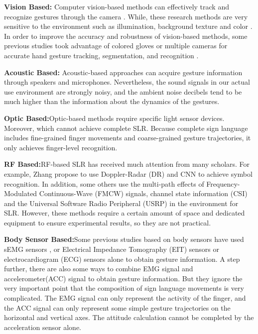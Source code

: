 \documentclass[10pt, conference, letterpaper]{IEEEtran}
\begin{document}
\vspace{1mm}
\textbf{Vision Based:} Computer vision-based methods can effectively track and recognize gestures through the camera \cite{huang2018video,neto2018sign,joshi2017personalizing,cui2017recurrent,tsironi2016gesture,ren2016robust,dong2015american,marin2014hand}. While, these research methods are very sensitive to the environment such as illumination, background texture and color \cite{mitra2007gesture,mantyjarvi2004enabling}. In order to improve the accuracy and robustness of vision-based methods, some previous studies
took advantage of  colored gloves \cite{starner1998real} or multiple cameras \cite{vogler1998asl} for accurate hand gesture tracking, segmentation, and recognition \cite{zhang2011framework}.

\textbf{Acoustic Based:} Acoustic-based \cite{mao2016cat,nandakumar2016fingerio} approaches can acquire gesture information through speakers and microphones. Nevertheless, the sound signals in our actual use environment are strongly noisy, and the ambient noise decibels tend to be much higher than the information about the dynamics of the gestures.

\textbf{Optic Based:}Optic-based \cite{zhao2018ppg,li2015human} methods require specific light sensor devices. Moreover, which cannot achieve complete SLR. Because complete sign language includes fine-grained finger movements and coarse-grained gesture trajectories, it \cite{zhao2018ppg} only achieves finger-level recognition.

\textbf{RF Based:}RF-based SLR has received much attention from many scholars. For example, Zhang \cite{zhang2017doppler} propose to use Doppler-Radar (DR) and CNN to achieve symbol recognition. In addition, some others use the multi-path effects of Frequency-Modulated Continuous-Wave (FMCW) \cite{adib2015multi,adib20143d} signals, channel state information (CSI) \cite{sun2015widraw,pu2013whole} and the Universal Software Radio Peripheral (USRP) in the environment for SLR. However, these methods require a certain amount of space and dedicated equipment to ensure experimental results, so they are not practical.

\textbf{Body Sensor Based:}Some previous studies based on body sensors have used sEMG sensors \cite{kosmidou2006evaluation,lu2014hand}, or Electrical Impedance Tomography (EIT) \cite{zhang2015tomo} sensors or electrocardiogram (ECG) \cite{zhang2011framework} sensors alone to obtain gesture information. A step further, there are also some ways to combine EMG signal and accelerometer(ACC) signal to obtain gesture information. But they ignore the very important point that the composition of sign language movements is very complicated. The EMG signal can only represent the activity of the finger, and the ACC signal can only represent some simple gesture trajectories on the horizontal and vertical axes. The attitude calculation cannot be completed by the acceleration sensor alone.
\end{document}
